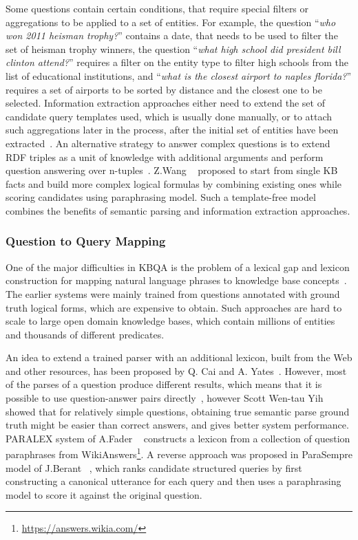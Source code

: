 Some questions contain certain conditions, that require special filters or aggregations to be applied to a set of entities. 
For example, the question ``\textit{who won 2011 heisman trophy?}'' contains a date, that needs to be used to filter the set of heisman trophy winners, the question ``\textit{what high school did president bill clinton attend?}'' requires a filter on the entity type to filter high schools from the list of educational institutions, and ``\textit{what is the closest airport to naples florida?}'' requires a set of airports to be sorted by distance and the closest one to be selected.
Information extraction approaches either need to extend the set of candidate query templates used, which is usually done manually, or to attach such aggregations later in the process, after the initial set of entities have been extracted~\cite{yih:ACL:2015:STAGG,xu2016enhancing}.
An alternative strategy to answer complex questions is to extend RDF triples as a unit of knowledge with additional arguments and perform question answering over n-tuples~\cite{yin2015answering}.
Z.Wang \etal~\cite{wang2015large} proposed to start from single KB facts and build more complex logical formulas by combining existing ones while scoring candidates using paraphrasing model.
Such a template-free model combines the benefits of semantic parsing and information extraction approaches.

\subsubsection{Question to Query Mapping}
\label{section:relatedwork:factoid:kbqa:mapping}

One of the major difficulties in KBQA is the problem of a lexical gap and lexicon construction for mapping natural language phrases to knowledge base concepts~\cite{BerantL14:parasempre,fader2013paraphrase}.
The earlier systems were mainly trained from questions annotated with ground truth logical forms, which are expensive to obtain.
Such approaches are hard to scale to large open domain knowledge bases, which contain millions of entities and thousands of different predicates.

An idea to extend a trained parser with an additional lexicon, built from the Web and other resources, has been proposed by Q. Cai and A. Yates~\cite{CaiY13}.
However, most of the parses of a question produce different results, which means that it is possible to use question-answer pairs directly~\cite{BerantCFL13:sempre}, however Scott Wen-tau Yih \etal~\cite{yih2016webquestionssp} showed that for relatively simple questions, obtaining true semantic parse ground truth might be easier than correct answers, and gives better system performance.
PARALEX system of A.Fader \etal~\cite{fader2013paraphrase} constructs a lexicon from a collection of question paraphrases from WikiAnswers\footnote{\href{url}{https://answers.wikia.com/}}.
A reverse approach was proposed in ParaSempre model of J.Berant \etal~\cite{BerantL14:parasempre}, which ranks candidate structured queries by first constructing a canonical utterance for each query and then uses a paraphrasing model to score it against the original question.

